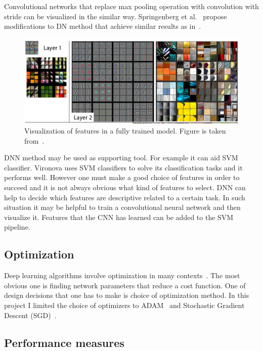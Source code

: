 \documentclass[a4paper, 11pt, table]{article}
\begin{document}
Convolutional networks that replace max pooling operation with convolution with stride can be visualized in the similar way. Springenberg et al.~\cite{DBLP:journals/corr/SpringenbergDBR14} propose modifications to DN method that achieve similar results as in~\cite{Zeiler2014}.

\begin{figure}[H]
\centering
\includegraphics[width=\textwidth]{zeiler_dnn_vis.png} 
\caption{Visualization of features in a fully trained model. Figure is taken from~\cite{Zeiler2014}.}\label{fig:dnn_vis}
\end{figure}

DNN method may be used as supporting tool. For example it can aid SVM classifier. Vironova uses SVM classifiers to solve its classification tasks and it performs well. However one must make a good choice of features in order to succeed and it is not always obvious what kind of features to select. DNN can help to decide which features are descriptive related to a certain task. In such situation it may be helpful to train a convolutional neural network and then visualize it. Features that the CNN has learned can be added to the SVM pipeline. 

\subsection{Optimization}
Deep learning algorithms involve optimization in many contexts~\cite{dl_book}. The most obvious one is finding network parameters that reduce a cost function. One of design decisions that one has to make is choice of optimization method. In this project I limited the choice of optimizers to ADAM~\cite{DBLP:journals/corr/KingmaB14} and Stochastic Gradient Descent (SGD)~\cite{Zhang04solvinglarge}.

\subsection{Performance measures}
\end{document}
